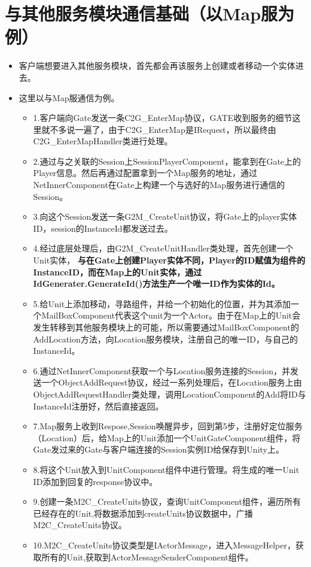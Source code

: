 \documentclass[9pt, b5paper]{article}
\begin{document}
\section{与其他服务模块通信基础（以Map服为例）}
\label{sec-8}
\begin{itemize}
\item 客户端想要进入其他服务模块，首先都会再该服务上创建或者移动一个实体进去。
\item 这里以与Map服通信为例。
\begin{itemize}
\item 1.客户端向Gate发送一条C2G\_EnterMap协议，GATE收到服务的细节这里就不多说一遍了，由于C2G\_EnterMap是IRequest，所以最终由C2G\_EnterMapHandler类进行处理。
\item 2.通过与之关联的Session上SessionPlayerComponent，能拿到在Gate上的Player信息。然后再通过配置拿到一个Map服务的地址，通过NetInnerComponent在Gate上构建一个与选好的Map服务进行通信的Session。
\item 3.向这个Session发送一条G2M\_CreateUnit协议，将Gate上的player实体ID，session的InstanceId都发送过去。
\item 4.经过底层处理后，由G2M\_CreateUnitHandler类处理，首先创建一个Unit实体， \textbf{与在Gate上创建Player实体不同，Player的ID赋值为组件的InstanceID，而在Map上的Unit实体，通过IdGenerater.GenerateId()方法生产一个唯一ID作为实体的Id。}
\item 5.给Unit上添加移动，寻路组件，并给一个初始化的位置，并为其添加一个MailBoxComponent代表这个unit为一个Actor。由于在Map上的Unit会发生转移到其他服务模块上的可能，所以需要通过MailBoxComponent的AddLocation方法，向Location服务模块，注册自己的唯一ID，与自己的InstanceId。
\item 6.通过NetInnerComponent获取一个与Location服务连接的Session，并发送一个ObjectAddRequest协议，经过一系列处理后，在Location服务上由ObjectAddRequestHandler类处理，调用LocationComponent的Add将ID与InstanceId注册好，然后直接返回。
\item 7.Map服务上收到Respose,Session唤醒异步，回到第5步，注册好定位服务（Location）后，给Map上的Unit添加一个UnitGateComponent组件，将Gate发过来的Gate与客户端连接的Session实例ID给保存到Unity上。
\item 8.将这个Unit放入到UnitComponent组件中进行管理。将生成的唯一Unit ID添加到回复的response协议中。
\item 9.创建一条M2C\_CreateUnits协议，查询UnitComponent组件，遍历所有已经存在的Unit,将数据添加到createUnits协议数据中，广播M2C\_CreateUnits协议。
\item 10.M2C\_CreateUnits协议类型是IActorMessage，进入MessageHelper，获取所有的Unit,获取到ActorMessageSenderComponent组件。

\end{itemize}
\end{itemize}
\end{document}
